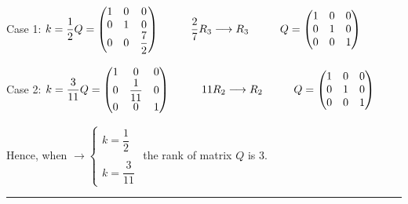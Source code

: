 \documentclass[fleqn]{article}
\begin{document}
\begin{enumerate}
      \bigbreak

      \textcolor{hwColor}{
        Case 1: 
        $
           k=\dfrac{1}{2}
           \\
           Q=\begin{pmatrix}
             1 & 0 & 0 \\
             0 & 1 & 0 \\
             0 & 0 & \dfrac{7}{2}
           \end{pmatrix}
           \hspace{1cm} \dfrac{2}{7}R_3 \longrightarrow R_3
           \hspace{1cm} Q=\begin{pmatrix}
            1 & 0 & 0 \\
            0 & 1 & 0 \\
            0 & 0 & 1
           \end{pmatrix}
        $
      }

      \bigbreak

      \textcolor{hwColor}{
        Case 2: 
        $
           k=\dfrac{3}{11}
           \\
           Q=\begin{pmatrix}
             1 & 0 & 0 \\
             0 & \dfrac{1}{11} & 0 \\
             0 & 0 & 1
           \end{pmatrix}
           \hspace{1cm} 11R_2 \longrightarrow R_2
           \hspace{1cm} Q=\begin{pmatrix}
            1 & 0 & 0 \\
            0 & 1 & 0 \\
            0 & 0 & 1
           \end{pmatrix}
        $
      }

      \textcolor{hwColor}{
          Hence, when 
        $
         \longrightarrow
         \begin{cases}
          k=\dfrac{1}{2} \\
          \\
          k= \dfrac{3}{11} 
         \end{cases}
        $
        the rank of matrix $Q$ is 3.
      }
      
      \textcolor{hwColor}{
        \rule{16cm}{0.4pt}
      }

      \bigbreak


\end{enumerate}
\end{document}
